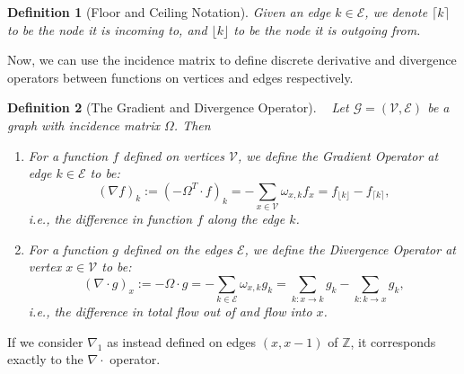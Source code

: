 \documentclass[conference]{IEEEtran}
\newcommand{\GG}{\mathcal{G}}
\newcommand{\VV}{\mathcal{V}}
\newcommand{\EE}{\mathcal{E}}
\theoremstyle{ieeestyle}
\newtheorem{defn}{Definition}
\begin{document}
\begin{defn}[Floor and Ceiling Notation]
    Given an edge $k \in \EE$, we denote $\lceil k \rceil$ to be the node it is incoming to, and $\lfloor k \rfloor$ to be the node it is outgoing from.
\end{defn}
Now, we can use the incidence matrix to define discrete derivative and divergence operators between functions on vertices and edges respectively.
\begin{defn}[The Gradient and Divergence Operator] \mbox{ }
Let $\GG = (\VV,\EE)$ be a graph with incidence matrix $\Omega$. Then 
\begin{enumerate}
\item For a function $f$ defined on vertices $\VV$, we define the \textit{Gradient Operator} at edge $k \in \EE$ to be: 
$$ (\nabla f)_k := (-\Omega^T \cdot f)_k =  -\sum_{x \in \VV} \omega_{x,k} f_x =f_{\lfloor k \rfloor} - f_{\lceil k \rceil},$$
i.e., the difference in function $f$ along the edge $k$.
\item
    For a function $g$ defined on the edges $\EE$, we define the \textit{Divergence Operator} at vertex $x \in \VV$ to be:
    \begin{equation*}
(\nabla \cdot g)_x := -\Omega \cdot g = -\sum_{k \in \EE} \omega_{x,k} g_k
= \sum_{k:x \rightarrow k} g_k - \sum_{k:k \rightarrow x} g_k,\end{equation*} 
i.e., the difference in total flow out of and  flow into $x$.
\end{enumerate}
\end{defn}
If we consider $\nabla_1$ as instead defined on edges $(x,x-1)$ of $\mathbb{Z}$, it corresponds exactly to the $\nabla \cdot$ operator.
\end{document}
